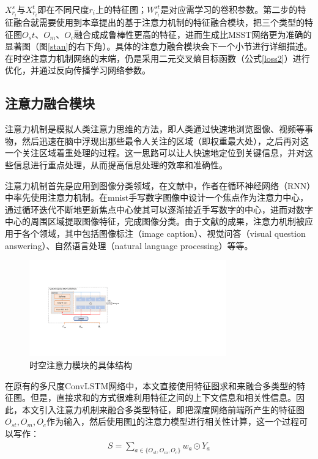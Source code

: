 $X^{s}_{r_i}$与$X^{t}_{r_i}$即在不同尺度$r_i$上的特征图；$W^{st}_{r_i}$是对应需学习的卷积参数。第二步的特征融合就需要使用到本章提出的基于注意力机制的特征融合模块，把三个类型的特征图$O_st$、$O_m$、$O_c$融合成成鲁棒性更高的特征，进而生成比MSST网络更为准确的显著图（图\ref{stan}的右下角）。具体的注意力融合模块会下一个小节进行详细描述。在时空注意力机制网络的末端，仍是采用二元交叉熵目标函数（公式\ref{loss2}）进行优化，并通过反向传播学习网络参数。

\subsection{注意力融合模块}
注意力机制是模拟人类注意力思维的方法，即人类通过快速地浏览图像、视频等事物，然后迅速在脑中浮现出那些最令人关注的区域（即权重最大处），之后再对这一个关注区域着重处理的过程。这一思路可以让人快速地定位到关键信息，并对这些信息进行重点处理，从而提高信息处理的效率和准确性。

注意力机制首先是应用到图像分类领域，在文献\cite{mnih2014recurrent}中，作者在循环神经网络（RNN）中率先使用注意力机制。在mnist手写数字图像中设计一个焦点作为注意力中心，通过循环迭代不断地更新焦点中心使其可以逐渐接近手写数字的中心，进而对数字中心的周围区域提取图像特征，完成图像分类。由于文献\cite{mnih2014recurrent}的成果，注意力机制被应用于各个领域，其中包括图像标注（image caption）\cite{lu2016hierarchical,chen2017sca}、视觉问答（visual question answering）\cite{lu2016hierarchical,yu2017multi}、自然语言处理（natural language processing）\cite{bahdanau2014neural,luong2015effective}等等。

\begin{figure}
 \centering
\includegraphics[width=8.5cm]{figures/attention}
\caption{时空注意力模块的具体结构}
\label{sta}
\end{figure}

在原有的多尺度ConvLSTM网络中，本文直接使用特征图求和来融合多类型的特征图。但是，直接求和的方式很难利用特征之间的上下文信息和相关性信息。因此，本文引入注意力机制来融合多类型特征，即把深度网络前端所产生的特征图$O_{st}, O_{m}, O_{c}$作为输入，然后使用图\ref{sta}的注意力模型进行相关性计算，这一个过程可以写作：
\begin{equation}
 \label{eq4_1}
 \begin{aligned}
   S  =  \sum_{a \in \{O_{st}, O_{m}, O_{c}\}} w_{a} \odot Y_{a}
   \end{aligned}
\end{equation}

